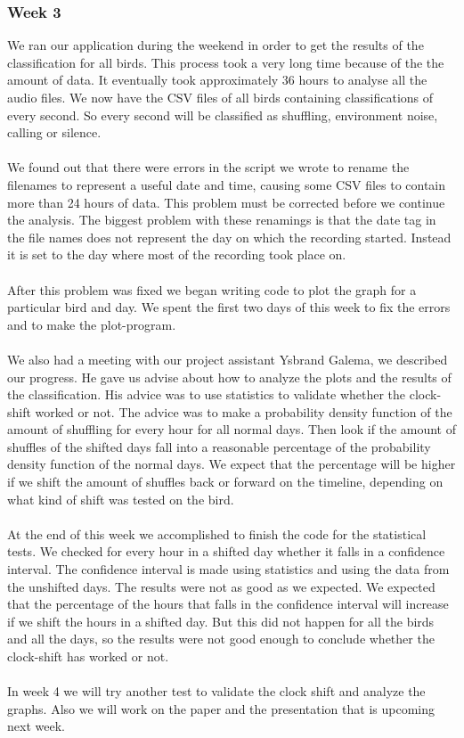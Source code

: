 \documentclass[a4paper]{article}
\begin{document}
\subsubsection*{Week 3}
We ran our application during the weekend in order to get the results of the classification for all birds. This process took a very long time because of the the amount of data. It eventually took approximately 36 hours to analyse all the audio files. We now have the CSV files of all birds containing classifications of every second. So every second will be classified as shuffling, environment noise, calling or silence.\\\\
 We found out that there were errors in the script we wrote to rename the filenames to represent a useful date and time, causing some CSV files to contain more than 24 hours of data. This problem must be corrected before we continue the analysis. The biggest problem with these renamings is that the date tag in the file names does not represent the day on which the recording started. Instead it is set to the day where most of the recording took place on.\\\\
After this problem was fixed we began writing code to plot the graph for a particular bird and day. We spent the first two days of this week to fix the errors and to make the plot-program.\\\\
We also had a meeting with our project assistant Ysbrand Galema, we described our progress. He gave us advise about how to analyze the plots and the results of the classification. His advice was to use statistics to validate whether the clock-shift worked or not. The advice was to make a probability density function of the amount of shuffling for every hour for all normal days. Then look if the amount of shuffles of the shifted days fall into a reasonable percentage of the probability density function of the normal days. We expect that the percentage will be higher if we shift the amount of shuffles back or forward on the timeline, depending on what kind of shift was tested on the bird.\\\\
At the end of this week we accomplished to finish the code for the statistical tests. We checked for every hour in a shifted day whether it falls in a confidence interval. The confidence interval is made using statistics and using the data from the unshifted days. The results were not as good as we expected. We expected that the percentage of the hours that falls in the confidence interval will increase if we shift the hours in a shifted day. But this did not happen for all the birds and all the days, so the results were not good enough to conclude whether the clock-shift has worked or not.\\\\In week 4 we will try another test to validate the clock shift and analyze the graphs. Also we will work on the paper and the presentation that is upcoming next week.  
\end{document}
